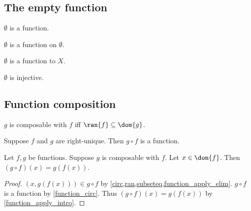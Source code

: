 \subsection{The empty function}

\begin{proposition}\label{emptyset_is_function}
    $\emptyset$ is a function.
\end{proposition}

\begin{proposition}\label{emptyset_is_function_on_emptyset}
    $\emptyset$ is a function on $\emptyset$.
\end{proposition}

\begin{proposition}\label{codom_of_emptyset_can_be_anything}
    $\emptyset$ is a function to $X$.
\end{proposition}

\begin{proposition}\label{emptyset_is_injective}
    $\emptyset$ is injective.
\end{proposition}


\subsection{Function composition}

\begin{abbreviation}\label{composable}
    $g$ is composable with $f$ iff $\ran{f}\subseteq \dom{g}$.
\end{abbreviation}

\begin{proposition}\label{function_circ}
    Suppose $f$ and $g$ are right-unique.
    Then $g\circ f$ is a function.
\end{proposition}

\begin{proposition}\label{circ_apply}
    Let $f, g$ be functions.
    Suppose $g$ is composable with $f$.
    Let $x\in\dom{f}$.
    Then $(g\circ f)(x) = g(f(x))$.
\end{proposition}
\begin{proof}
    $(x, g(f(x)))\in g\circ f$ by \cref{circ,ran,subseteq,function_apply_elim}.
    $g\circ f$ is a function by \cref{function_circ}.
    Thus $(g\circ f)(x) = g(f(x))$ by \cref{function_apply_intro}.
\end{proof}


